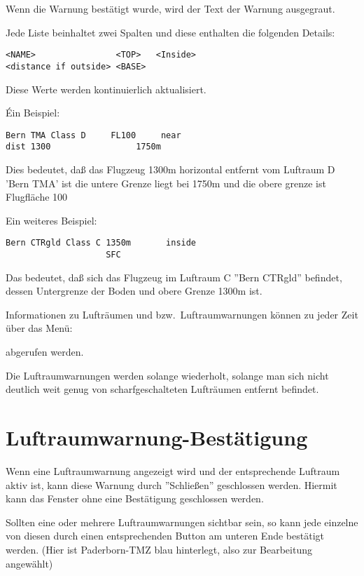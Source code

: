 Wenn die Warnung bestätigt wurde, wird der Text der Warnung ausgegraut.

Jede Liste beinhaltet zwei Spalten  und diese enthalten die folgenden Details:



\begin{verbatim}
<NAME>                <TOP>   <Inside>
<distance if outside> <BASE>
\end{verbatim}

Diese Werte werden kontinuierlich aktualisiert.

Éin Beispiel:

\begin{verbatim}
Bern TMA Class D     FL100     near
dist 1300                 1750m
\end{verbatim}

Dies bedeutet, daß das Flugzeug 1300m horizontal
entfernt vom Luftraum D 'Bern TMA'  ist die untere Grenze liegt bei
1750m und die obere grenze ist Flugfläche 100



Ein weiteres Beispiel:
\begin{verbatim}
Bern CTRgld Class C 1350m	    inside
                    SFC
\end{verbatim}

Das bedeutet, daß sich das Flugzeug im Luftraum C ''Bern CTRgld'' befindet,
dessen Untergrenze der Boden und obere Grenze 1300m ist.

Informationen  zu Lufträumen und  bzw.\  Luftraumwarnungen  können zu jeder
Zeit  über das Menü:

\blink{}\blink{}

abgerufen werden.

Die Luftraumwarnungen werden solange wiederholt, solange man sich
nicht deutlich weit genug von scharfgeschalteten Lufträumen entfernt befindet.

\section{Luftraumwarnung-Bestätigung}

Wenn eine Luftraumwarnung angezeigt wird und der entsprechende
Luftraum aktiv ist, kann diese Warnung durch ''Schließen''  geschlossen werden.
Hiermit kann das Fenster ohne eine Bestätigung geschlossen werden.

Sollten eine oder mehrere Luftraumwarnungen sichtbar sein, so kann jede einzelne von diesen durch einen entsprechenden Button am unteren Ende bestätigt werden. (Hier ist Paderborn-TMZ blau hinterlegt, also zur Bearbeitung angewählt) 


